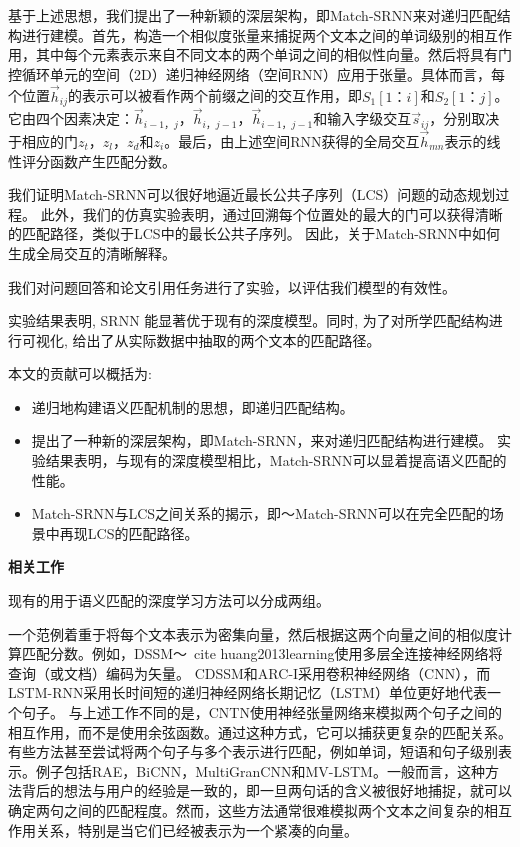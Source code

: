 基于上述思想，我们提出了一种新颖的深层架构，即Match-SRNN来对递归匹配结构进行建模。首先，构造一个相似度张量来捕捉两个文本之间的单词级别的相互作用，其中每个元素表示来自不同文本的两个单词之间的相似性向量。然后将具有门控循环单元的空间（2D）递归神经网络（空间RNN）应用于张量。具体而言，每个位置$ \vec {h} _ {ij} $的表示可以被看作两个前缀之间的交互作用，即$ {S_1 [1 {：} i]} $和$ {S_2 [1 { ：} j]} $。它由四个因素决定：$ \vec {h} _ {i-1，j}，\vec {h} _ {i，j-1}，\vec {h} _ {i-1，j-1 } $和输入字级交互$ \vec {s} _ {ij} $，分别取决于相应的门$ z_t，z_l，z_d $和$ z_i $。最后，由上述空间RNN获得的全局交互$ \vec {h} _ {mn} $表示的线性评分函数产生匹配分数。

我们证明Match-SRNN可以很好地逼近最长公共子序列（LCS）问题的动态规划过程。 此外，我们的仿真实验表明，通过回溯每个位置处的最大的门可以获得清晰的匹配路径，类似于LCS中的最长公共子序列。 因此，关于Match-SRNN中如何生成全局交互的清晰解释。

我们对问题回答和论文引用任务进行了实验，以评估我们模型的有效性。

实验结果表明, SRNN 能显著优于现有的深度模型。同时, 为了对所学匹配结构进行可视化, 给出了从实际数据中抽取的两个文本的匹配路径。

本文的贡献可以概括为:
\begin{itemize}
\item 递归地构建语义匹配机制的思想，即递归匹配结构。
\item 提出了一种新的深层架构，即Match-SRNN，来对递归匹配结构进行建模。 实验结果表明，与现有的深度模型相比，Match-SRNN可以显着提高语义匹配的性能。
\item Match-SRNN与LCS之间关系的揭示，即〜Match-SRNN可以在完全匹配的场景中再现LCS的匹配路径。
\end{itemize}

\textbf{相关工作}

现有的用于语义匹配的深度学习方法可以分成两组。

一个范例着重于将每个文本表示为密集向量，然后根据这两个向量之间的相似度计算匹配分数。例如，DSSM〜\ cite {huang2013learning}使用多层全连接神经网络将查询（或文档）编码为矢量。
CDSSM和ARC-I采用卷积神经网络（CNN），而LSTM-RNN采用长时间短的递归神经网络长期记忆（LSTM）单位更好地代表一个句子。
与上述工作不同的是，CNTN使用神经张量网络来模拟两个句子之间的相互作用，而不是使用余弦函数。通过这种方式，它可以捕获更复杂的匹配关系。有些方法甚至尝试将两个句子与多个表示进行匹配，例如单词，短语和句子级别表示。例子包括RAE，BiCNN，MultiGranCNN和MV-LSTM。一般而言，这种方法背后的想法与用户的经验是一致的，即一旦两句话的含义被很好地捕捉，就可以确定两句之间的匹配程度。然而，这些方法通常很难模拟两个文本之间复杂的相互作用关系，特别是当它们已经被表示为一个紧凑的向量。

